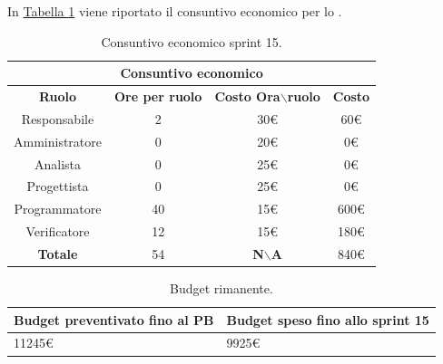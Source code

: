 In \hyperref[tab:sprint15_consuntivo_economico]{Tabella \ref{tab:sprint15_consuntivo_economico}} viene riportato il consuntivo economico per lo .
\begin{table}[H]
    \centering
    \begin{tabular}{|c|c|c|c|}
        \hline
            \multicolumn{4}{|c|}{\textbf{Consuntivo economico}} \\ 
        \hline
            \textbf{Ruolo} & \textbf{Ore per ruolo} & \textbf{Costo Ora$\backslash$ruolo} & \textbf{Costo} \\
        \hline
        Responsabile & 2 & 30€ & 60€ \\
        \hline
        Amministratore & 0 & 20€ & 0€ \\
        \hline
        Analista & 0 & 25€ & 0€ \\
        \hline
        Progettista & 0 & 25€ & 0€ \\
        \hline
        Programmatore & 40 & 15€ & 600€ \\
        \hline
        Verificatore & 12 & 15€ & 180€ \\
        \hline 
        \textbf{Totale} & 54 & \textbf{N$\backslash$A} & 840€  \\
        \hline
    \end{tabular}
    \caption{Consuntivo economico sprint 15.}
    \label{tab:sprint15_consuntivo_economico}
\end{table}

\begin{table}[H]
    \centering
    \begin{tabular}{| l | l |}
    \hline
    \textbf{Budget preventivato fino al PB} & \textbf{Budget speso fino allo sprint 15}\\
    \hline
        11245€ & 9925€ \\
    \hline
    \end{tabular}
    \caption{Budget rimanente.}
    \label{tab:budget_rimanente_sprint15}
\end{table}